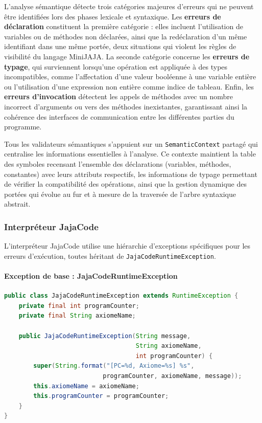 L'analyse sémantique détecte trois catégories majeures d'erreurs qui ne peuvent être identifiées lors des phases lexicale et syntaxique. Les \textbf{erreurs de déclaration} constituent la première catégorie : elles incluent l'utilisation de variables ou de méthodes non déclarées, ainsi que la redéclaration d'un même identifiant dans une même portée, deux situations qui violent les règles de visibilité du langage MiniJAJA. La seconde catégorie concerne les \textbf{erreurs de typage}, qui surviennent lorsqu'une opération est appliquée à des types incompatibles, comme l'affectation d'une valeur booléenne à une variable entière ou l'utilisation d'une expression non entière comme indice de tableau. Enfin, les \textbf{erreurs d'invocation} détectent les appels de méthodes avec un nombre incorrect d'arguments ou vers des méthodes inexistantes, garantissant ainsi la cohérence des interfaces de communication entre les différentes parties du programme.

Tous les validateurs sémantiques s'appuient sur un \texttt{SemanticContext} partagé qui centralise les informations essentielles à l'analyse. Ce contexte maintient la table des symboles recensant l'ensemble des déclarations (variables, méthodes, constantes) avec leurs attributs respectifs, les informations de typage permettant de vérifier la compatibilité des opérations, ainsi que la gestion dynamique des portées qui évolue au fur et à mesure de la traversée de l'arbre syntaxique abstrait.

\subsubsection{Interpréteur JajaCode}

L'interpréteur JajaCode utilise une hiérarchie d'exceptions spécifiques pour les erreurs d'exécution, toutes héritant de \texttt{JajaCodeRuntimeException}.

\paragraph{Exception de base : JajaCodeRuntimeException}

\vspace{0.3cm}
\begin{lstlisting}[language=java, caption=JajaCodeRuntimeException,label={lst:jjcruntimeexception}]
public class JajaCodeRuntimeException extends RuntimeException {
    private final int programCounter;
    private final String axiomeName;

    public JajaCodeRuntimeException(String message,
                                    String axiomeName,
                                    int programCounter) {
        super(String.format("[PC=%d, Axiome=%s] %s",
                           programCounter, axiomeName, message));
        this.axiomeName = axiomeName;
        this.programCounter = programCounter;
    }
}
\end{lstlisting}

